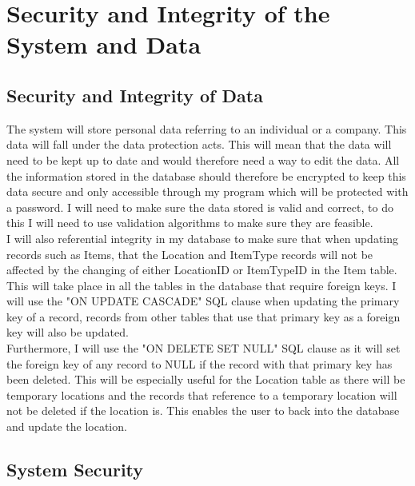\section{Security and Integrity of the System and Data}

\subsection{Security and Integrity of Data}

The system will store personal data referring to an individual or a company. This data will fall under the data protection acts. This will mean that the data will need to be kept up to date and would therefore need a way to edit the data. All the information stored in the database should therefore be encrypted to keep this data secure and only accessible through my program which will be protected with a password. I will need to make sure the data stored is valid and correct, to do this I will need to use validation algorithms to make sure they are feasible.\\

\noindent I will also referential integrity in my database to make sure that when updating records such as Items, that the Location and ItemType records will not be affected by the changing of either LocationID or ItemTypeID in the Item table. This will take place in all the tables in the database that require foreign keys. I will use the "ON UPDATE CASCADE" SQL clause when updating the primary key of a record, records from other tables that use that primary key as a foreign key will also be updated.\\

\noindent Furthermore, I will use the "ON DELETE SET NULL" SQL clause as it will set the foreign key of any record to NULL if the record with that primary key has been deleted. This will be especially useful for the Location table as there will be temporary locations and the records that reference to a temporary location will not be deleted if the location is. This enables the user to back into the database and update the location.

\subsection{System Security}

